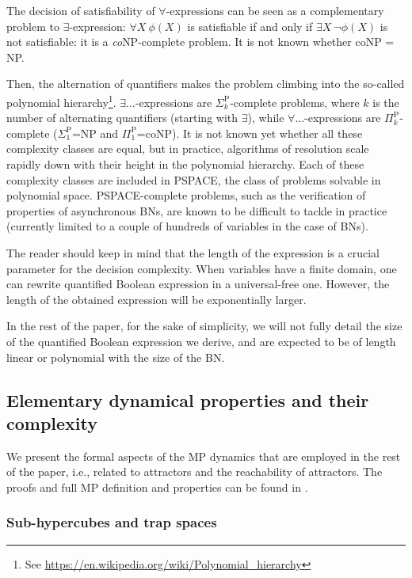 \documentclass[PCJ,Unicode,screen,mode=plain]{cedram}
\begin{document}
The decision of satisfiability of \(\forall\)-expressions can be seen as
a complementary problem to \(\exists\)-expression: \(\forall X~\phi(X)\)
is satisfiable if and only if \(\exists X~\neg\phi(X)\) is not
satisfiable: it is a \emph{co}NP-complete problem. It is not known
whether coNP = NP.

Then, the alternation of quantifiers makes the problem climbing into the
so-called polynomial hierarchy\footnote{See
  \url{https://en.wikipedia.org/wiki/Polynomial_hierarchy}}.
\(\exists\ldots\)-expressions are \(\Sigma_k^{\mathrm P}\)-complete
problems, where \(k\) is the number of alternating quantifiers (starting
with \(\exists\)), while \(\forall\ldots\)-expressions are
\(\Pi_k^{\mathrm P}\)-complete (\(\Sigma_1^{\mathrm P}\)=NP and
\(\Pi_1^{\mathrm P}\)=coNP). It is not known yet whether all these
complexity classes are equal, but in practice, algorithms of resolution
scale rapidly down with their height in the polynomial hierarchy. Each
of these complexity classes are included in PSPACE, the class of
problems solvable in polynomial space. PSPACE-complete problems, such as
the verification of properties of asynchronous BNs, are known to be
difficult to tackle in practice (currently limited to a couple of
hundreds of variables in the case of BNs).

The reader should keep in mind that the length of the expression is a
crucial parameter for the decision complexity. When variables have a
finite domain, one can rewrite quantified Boolean expression in a
universal-free one. However, the length of the obtained expression will
be exponentially larger.

In the rest of the paper, for the sake of simplicity, we will not fully
detail the size of the quantified Boolean expression we derive, and are
expected to be of length linear or polynomial with the size of the BN.
\hypertarget{elementary-dynamical-properties-and-their-complexity}{%
\subsection{Elementary dynamical properties and their
complexity}\label{elementary-dynamical-properties-and-their-complexity}}

We present the formal aspects of the MP dynamics that are employed in
the rest of the paper, i.e., related to attractors and the reachability
of attractors. The proofs and full MP definition and properties can be
found in \citep{Pauleve2020}.

\hypertarget{sub-hypercubes-and-trap-spaces}{%
\subsubsection{Sub-hypercubes and trap
spaces}\label{sub-hypercubes-and-trap-spaces}}
\end{document}
